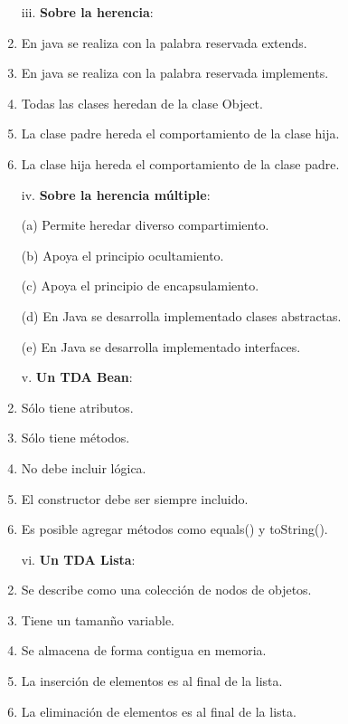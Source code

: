 \documentclass[10pt]{article}
\begin{document}
{\begin{enumerate}
\begin{multicols}{2}
			\begin{enumerate}[label=(\alph*)]
				\item[iii.] \textbf{Sobre la herencia}:
				\item En java se realiza con la palabra reservada extends.
				\item En java se realiza con la palabra reservada implements.
				\item Todas las clases heredan de la clase Object.
				\item La clase padre hereda el comportamiento de la clase hija.
				\item La clase hija hereda el comportamiento de la clase padre.
			\end{enumerate}

			\begin{enumerate}[label=(\alph*)]
				\item[iv.] \textbf{Sobre la herencia m\'ultiple}:
				\item[(a)] Permite heredar diverso compartimiento.
                \item[(b)] Apoya el principio ocultamiento.
                \item[(c)] Apoya el principio de encapsulamiento.
                \item[(d)] En Java se desarrolla implementado clases abstractas.
                \item[(e)] En Java se desarrolla implementado interfaces.
			\end{enumerate}

			\begin{enumerate}[label=(\alph*)]
				\item[v.] \textbf{Un TDA Bean}:
				\item S\'olo tiene atributos.
				\item S\'olo tiene m\'etodos.
				\item No debe incluir l\'ogica.
				\item El constructor debe ser siempre incluido.
				\item Es posible agregar m\'etodos como equals() y toString().
			\end{enumerate}

			\begin{enumerate}[label=(\alph*)]
				\item[vi.] \textbf{Un TDA Lista}:
				\item Se describe como una colecci\'on de nodos de objetos.
				\item Tiene un taman\~no variable.
				\item Se almacena de forma contigua en memoria.
				\item La inserci\'on de elementos es al final de la lista.
				\item La eliminaci\'on de elementos es al final de la lista.
			\end{enumerate}


\end{multicols}
\end{enumerate}}
\end{document}

